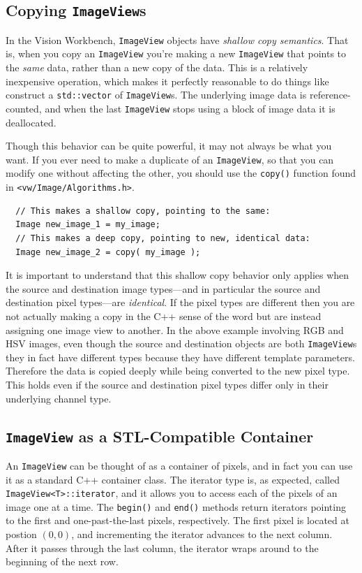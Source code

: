 \subsection{Copying {\tt ImageView}s}

In the Vision Workbench, \verb#ImageView# objects have {\it shallow
copy semantics}.  That is, when you copy an \verb#ImageView# you're
making a new \verb#ImageView# that points to the {\it same} data,
rather than a new copy of the data.  This is a relatively inexpensive
operation, which makes it perfectly reasonable to do things like
construct a \verb#std::vector# of \verb#ImageView#s.  The underlying
image data is reference-counted, and when the last \verb#ImageView#
stops using a block of image data it is deallocated.

Though this behavior can be quite powerful, it may not always be 
what you want.  If you ever need to make a duplicate of an 
\verb#ImageView#, so that you can modify one without affecting the 
other, you should use the \verb#copy()# function found in 
\verb#<vw/Image/Algorithms.h>#.
\begin{verbatim}
  // This makes a shallow copy, pointing to the same:
  Image new_image_1 = my_image;
  // This makes a deep copy, pointing to new, identical data:
  Image new_image_2 = copy( my_image );
\end{verbatim}

It is important to understand that this shallow copy behavior only
applies when the source and destination image types---and in particular
the source and destination pixel types---are {\it identical}.  If the
pixel types are different then you are not actually making a copy in 
the C++ sense of the word but are instead assigning one image view to 
another.  In the above example involving RGB and HSV images, even 
though the source and destination objects are both \verb#ImageView#s 
they in fact have different types because they have different template 
parameters.  Therefore the data is copied deeply while being converted 
to the new pixel type.  This holds even if the source and destination 
pixel types differ only in their underlying channel type.

\subsection{{\tt ImageView} as a STL-Compatible Container}

An \verb#ImageView# can be thought of as a container of pixels, and in
fact you can use it as a standard C++ container class.  The iterator
type is, as expected, called \verb#ImageView<T>::iterator#, and it
allows you to access each of the pixels of an image one at a time.
The \verb#begin()# and \verb#end()# methods return iterators pointing
to the first and one-past-the-last pixels, respectively.  The first
pixel is located at postion $(0,0)$, and incrementing the iterator
advances to the next column.  After it passes through the last column,
the iterator wraps around to the beginning of the next row.

